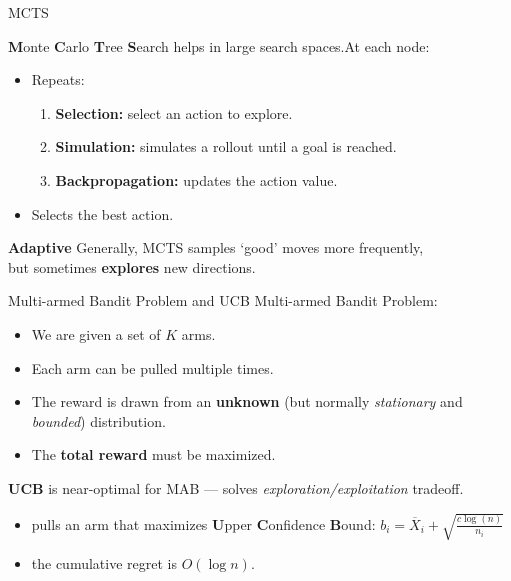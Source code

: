 \documentclass{beamer}
\begin{document}
\begin{frame}{MCTS}

{\bf M}onte {\bf C}arlo {\bf T}ree {\bf S}earch helps in large search spaces.At each node:
\begin{itemize}
\item Repeats:
  \begin{enumerate}
    \item \textbf{Selection:} select an action to explore.
    \item \textbf{Simulation:} simulates a rollout until a goal is reached.
    \item \textbf{Backpropagation:} updates the action value.
  \end{enumerate}
\item Selects the best action.
\end{itemize}
\vspace{1em}
\textbf{Adaptive} Generally, MCTS samples `good' moves more frequently,\\
but sometimes {\bf explores} new directions.
\end{frame}

\begin{frame}{Multi-armed Bandit Problem and UCB}
Multi-armed Bandit Problem:
\begin{itemize}
\item We are given a set of $K$ arms.
\item Each arm can be pulled multiple times.
\item The reward is drawn from an {\bf unknown} (but normally {\it
    stationary} and {\it bounded}) distribution.
\item The {\bf total reward} must be maximized.
\end{itemize}

{\bf UCB} is near-optimal for MAB --- solves
{\it exploration/exploitation} tradeoff.
\begin{itemize}
\item pulls an arm that maximizes {\bf U}pper {\bf C}onfidence {\bf
    B}ound: $b_i=\overline X_i+\sqrt {\frac {c \log (n)} {n_i}}$
\item the cumulative regret is $O(\log n)$.
\end{itemize}
\end{frame}
\end{document}
